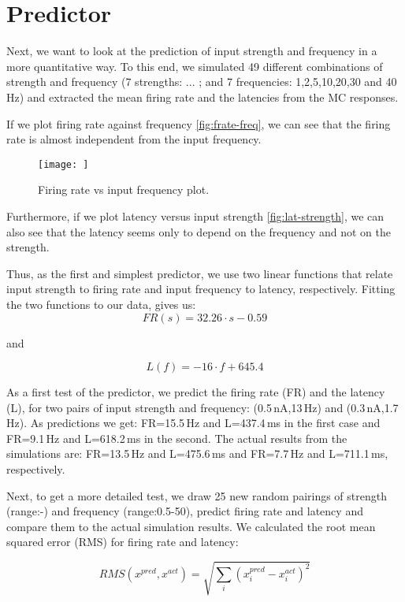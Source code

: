 \documentclass[11pt]{report}
\begin{document}
\section*{Predictor}
Next, we want to look at the prediction of input strength and frequency in a more quantitative way. To this end, we simulated 49 different combinations of
strength and frequency (7 strengths: ... ; and 7 frequencies: 1,2,5,10,20,30 and 40\,Hz) and extracted the mean firing rate and the latencies from the MC responses.

If we plot firing rate against frequency \ref{fig:frate-freq}, we can see that the firing rate is almost independent from the input frequency.

\begin{figure}[!ht]
\centering
\texttt{[image: ]}
\caption{Firing rate vs input frequency plot.}
\label{fig;frate-freq}
\end{figure}

Furthermore, if we plot latency versus input strength \ref{fig:lat-strength}, we can also see that the latency seems only to depend on the frequency and not on the strength.

Thus, as the first and simplest predictor, we use two linear functions that relate input strength to firing rate and input frequency to latency, respectively. Fitting the two functions to our data,
gives us:
\[
 FR(s) = 32.26\cdot s - 0.59
\]

and 

\[
 L(f) = -16\cdot f + 645.4
\]

As a first test of the predictor, we predict the firing rate (FR) and the latency (L), for two pairs of input strength and frequency: (0.5\,nA,13\,Hz) and (0.3\,nA,1.7\,Hz).
As predictions we get: FR=15.5\,Hz and L=437.4\,ms in the first case and  FR=9.1\,Hz and L=618.2\,ms in the second.
The actual results from the simulations are: FR=13.5\,Hz and L=475.6\,ms and FR=7.7\,Hz and L=711.1\,ms, respectively.

Next, to get a more detailed test, we draw 25 new random pairings of strength (range:-) and frequency (range:0.5-50), predict firing rate and latency and compare them to the actual simulation results.
We calculated the root mean squared error (RMS) for firing rate and latency:

\[
 RMS(x^{pred},x^{act})=\sqrt { \sum_i (x^{pred}_i - x^{act}_i)^2}
\]
\end{document}
